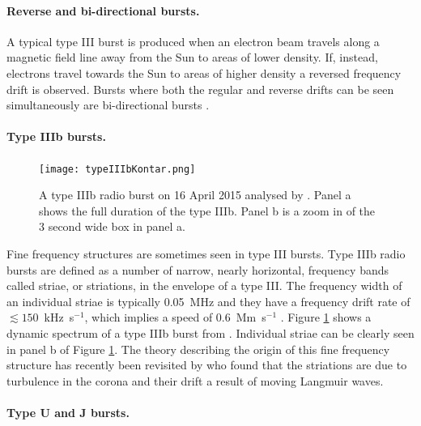 \paragraph{Reverse and bi-directional bursts.}

A typical type III burst is produced when an electron beam travels along a magnetic field line away from the Sun to areas of lower density. If, instead, electrons travel towards the Sun to areas of higher density a reversed frequency drift is observed. Bursts where both the regular and reverse drifts can be seen simultaneously are bi-directional bursts \citep{Reid2014}.

\paragraph{Type IIIb bursts.}

\begin{figure}[ht]
\centering
\texttt{[image: typeIIIbKontar.png]}
\caption[The type IIIb radio burst from \cite{Kontar2017}.]{A type IIIb radio burst on 16 April 2015 analysed by \cite{Kontar2017}. Panel a shows the full duration of the type IIIb. Panel b is a zoom in of the 3 second wide box in panel a.}
\label{fig:typeIIIbKontar}
\end{figure}

Fine frequency structures are sometimes seen in type III bursts. Type IIIb radio bursts are defined as a number of narrow, nearly horizontal, frequency bands called striae, or striations, in the envelope of a type III. The frequency width of an individual striae is typically 0.05~MHz \citep{McLean1985} and they have a frequency drift rate of $\lesssim 150$~kHz~s$^{-1}$, which implies a speed of 0.6~Mm~s$^{-1}$ \cite{Sharykin2018}. Figure \ref{fig:typeIIIbKontar} shows a dynamic spectrum of a type IIIb burst from \cite{Kontar2017}. Individual striae can be clearly seen in panel b of Figure \ref{fig:typeIIIbKontar}. The theory describing the origin of this fine frequency structure has recently been revisited by \cite{Reid2021} who found that the striations are due to turbulence in the corona and their drift a result of moving Langmuir waves.

\paragraph{Type U and J bursts.}

